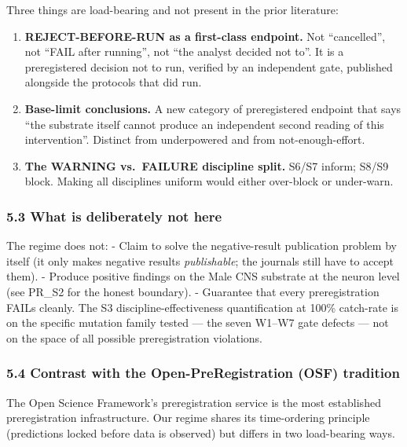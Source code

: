 \documentclass[
]{article}
\providecommand{\tightlist}{%
  \setlength{\itemsep}{0pt}\setlength{\parskip}{0pt}}
\begin{document}
Three things are load-bearing and not present in the prior literature:

\begin{enumerate}
\def\labelenumi{\arabic{enumi}.}
\tightlist
\item
  \textbf{REJECT-BEFORE-RUN as a first-class endpoint.} Not
  ``cancelled'', not ``FAIL after running'', not ``the analyst decided
  not to''. It is a preregistered decision not to run, verified by an
  independent gate, published alongside the protocols that did run.
\item
  \textbf{Base-limit conclusions.} A new category of preregistered
  endpoint that says ``the substrate itself cannot produce an
  independent second reading of this intervention''. Distinct from
  underpowered and from not-enough-effort.
\item
  \textbf{The WARNING vs.~FAILURE discipline split.} S6/S7 inform; S8/S9
  block. Making all disciplines uniform would either over-block or
  under-warn.
\end{enumerate}

\subsubsection{5.3 What is deliberately not
here}\label{what-is-deliberately-not-here}

The regime does not: - Claim to solve the negative-result publication
problem by itself (it only makes negative results \emph{publishable};
the journals still have to accept them). - Produce positive findings on
the Male CNS substrate at the neuron level (see PR\_S2 for the honest
boundary). - Guarantee that every preregistration FAILs cleanly. The S3
discipline-effectiveness quantification at 100\% catch-rate is on the
specific mutation family tested --- the seven W1--W7 gate defects ---
not on the space of all possible preregistration violations.

\subsubsection{5.4 Contrast with the Open-PreRegistration (OSF)
tradition}\label{contrast-with-the-open-preregistration-osf-tradition}

The Open Science Framework's preregistration service is the most
established preregistration infrastructure. Our regime shares its
time-ordering principle (predictions locked before data is observed) but
differs in two load-bearing ways.
\end{document}
